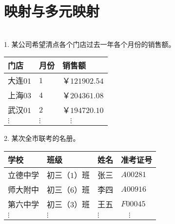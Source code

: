 \documentclass[12pt,UTF8]{ctexbook}
\begin{document}
\section{映射与多元映射}
\begin{ex}
    \mbox{}\\
    1. 某公司希望清点各个门店过去一年各个月份的销售额。
    \begin{center}
        \begin{tabular}{| p{4em}<{\centering} | p{2em}<{\centering} | p{6em}<{\centering} |}
            \hline
            门店 & 月份 & 销售额 \\ [0.5ex] 
            \hline
            大连$01$ & $1$ & ￥$121902.54$ \\  
            \hline
            上海$03$ & $4$ & ￥$204361.08$ \\  
            \hline
            武汉$01$ & $2$ & ￥$194720.10$ \\  
            \hline
            $\vdots$ & $\vdots$ & $\quad\vdots$ \\   
            \hline
        \end{tabular}
    \end{center}
    2. 某次全市联考的名册。
    \begin{center}
        \begin{tabular}{| p{4em}<{\centering} | p{6em}<{\centering} | p{3em}<{\centering} | p{4em}<{\centering} |}
            \hline
            学校 & 班级 & 姓名 & 准考证号 \\ [0.5ex] 
            \hline
            立德中学 & 初三（$1$）班 & 张三 & $A00281$ \\  
            \hline
            师大附中 & 初三（$6$）班 & 李四 & $A00916$ \\  
            \hline
            第六中学 & 初三（$3$）班 & 王五 & $F00045$ \\  
            \hline
            $\vdots$ & $\vdots$& $\vdots$ & $\quad\vdots$ \\   
            \hline
        \end{tabular}
    \end{center}
\end{ex}
\end{document}
